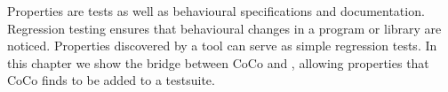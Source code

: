 \chapstart Properties are tests as well as behavioural specifications and
documentation.  Regression testing ensures that behavioural changes in a program
or library are noticed.  Properties discovered by a tool can serve as simple
regression tests.  In this chapter we show the bridge between CoCo and
\dejafu{}, allowing properties that CoCo finds to be added to a \dejafu{}
testsuite.
